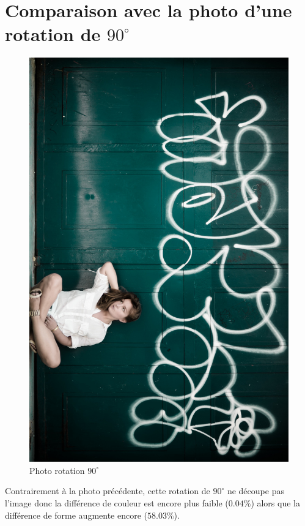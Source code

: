 \documentclass[]{article}
\begin{document}
\newpage

\section{Comparaison avec la photo d'une rotation de
$90^{\circ}$}\label{comparaison-avec-la-photo-dune-rotation-de-90circ}

\begin{figure}[htbp]
\centering
\includegraphics[scale=0.47]{photos/rotation.jpg}
\caption{Photo rotation $90^{\circ}$}
\end{figure}

Contrairement à la photo précédente, cette rotation de $90^{\circ}$ ne
découpe pas l'image donc la différence de couleur est encore plus faible
($0.04\%$) alors que la différence de forme augmente encore ($58.03\%$).
\end{document}
